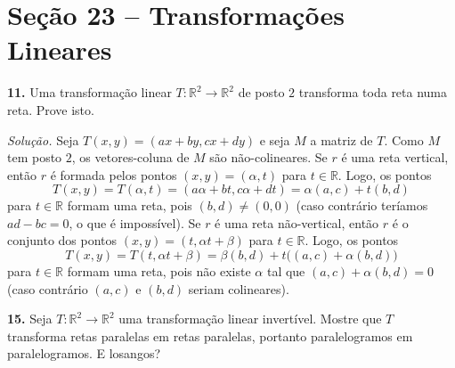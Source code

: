 \documentclass[a4paper,11pt]{article}
\newcommand{\R}{\mathbb{R}}
\begin{document}
\section*{Seção 23 -- Transformações Lineares}

\textbf{11.}
Uma transformação linear $T : \R^2 \to \R^2$ de posto $2$ transforma toda reta numa reta.
Prove isto.

\vspace{\baselineskip}

\emph{Solução.}
Seja $T(x,y) = (ax + by, cx + dy)$ e seja $M$ a matriz de $T$.
Como $M$ tem posto $2$, os vetores-coluna de $M$ são não-colineares.
Se $r$ é uma reta vertical, então $r$ é formada pelos pontos $(x,y) = (\alpha,t)$ para $t \in \R$.
Logo, os pontos
\[
  T(x,y) = T(\alpha, t) = (a \alpha + bt, c \alpha + dt) = \alpha(a, c) + t(b,d)
\]
para $t \in \R$ formam uma reta, pois $(b,d) \neq (0,0)$ (caso contrário teríamos $ad - bc = 0$, o que é impossível).
Se $r$ é uma reta não-vertical, então $r$ é o conjunto dos pontos $(x,y) = (t, \alpha t + \beta)$ para $t \in \R$.
Logo, os pontos
\[
  T(x,y) = T(t, \alpha t + \beta) = \beta(b,d) + t \big( (a,c) + \alpha (b,d) \big)
\]
para $t \in \R$ formam uma reta, pois não existe $\alpha$ tal que $(a,c) + \alpha(b,d) = 0$ (caso contrário $(a,c)$ e $(b,d)$ seriam colineares).

\vspace{\baselineskip}

\textbf{15.}
Seja $T : \R^2 \to \R^2$ uma transformação linear invertível.
Mostre que $T$ transforma retas paralelas em retas paralelas, portanto paralelogramos em paralelogramos.
E losangos?

\vspace{\baselineskip}
\end{document}
